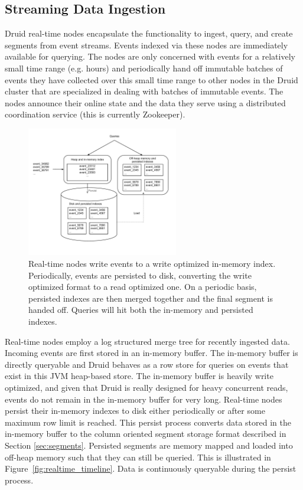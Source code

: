 \documentclass{vldb}
\begin{document}
\subsection{Streaming Data Ingestion}
Druid real-time nodes encapsulate the functionality to ingest, query, and create
segments from event streams. Events indexed via these nodes are immediately
available for querying.  The nodes are only concerned with events for a relatively
small time range (e.g. hours) and periodically hand off immutable batches of events they
have collected over this small time range to other nodes in the Druid cluster
that are specialized in dealing with batches of immutable events. The nodes
announce their online state and the data they serve using a distributed
coordination service (this is currently Zookeeper\cite{hunt2010zookeeper}).

\begin{figure}
\centering
\includegraphics[width = 2.6in]{realtime_flow} 
\caption{
Real-time nodes write events to a write optimized in-memory index.
Periodically, events are persisted to disk, converting the write optimized
format to a read optimized one. On a periodic basis, persisted indexes are
then merged together and the final segment is handed off.  Queries will hit
both the in-memory and persisted indexes.  
}
\label{fig:realtime_flow}
\end{figure}

Real-time nodes employ a log structured merge tree\cite{o1996log} for recently
ingested data. Incoming events are first stored in an in-memory buffer. The
in-memory buffer is directly queryable and Druid behaves as a row store for
queries on events that exist in this JVM heap-based store. The in-memory buffer
is heavily write optimized, and given that Druid is really designed for heavy
concurrent reads, events do not remain in the in-memory buffer for very long.
Real-time nodes persist their in-memory indexes to disk either periodically or
after some maximum row limit is reached. This persist process converts data
stored in the in-memory buffer to the column oriented segment storage format
described in Section \ref{sec:segments}.  Persisted segments are memory mapped
and loaded into off-heap memory such that they can still be queried. This is
illustrated in Figure~\ref{fig:realtime_timeline}. Data is continuously
queryable during the persist process.
\end{document}
